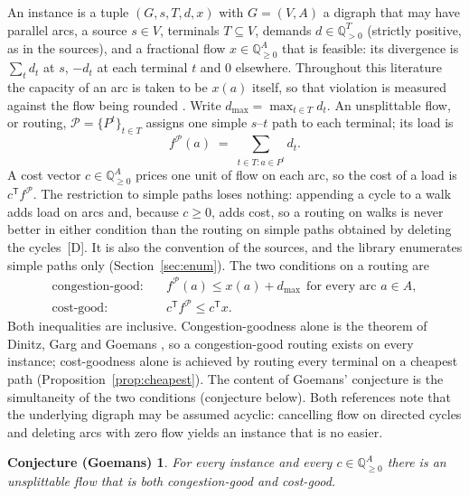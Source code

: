 \documentclass[11pt]{article}
\newtheorem*{namedconj}{Conjecture (Goemans)}
\theoremstyle{remark}
\newcommand{\dmax}{d_{\max}}
\newcommand{\flow}{f}
\newcommand{\Q}{\mathbb{Q}}
\begin{document}
An instance is a tuple $(G,s,T,d,x)$ with $G=(V,A)$ a digraph that may have parallel arcs, a source $s\in V$,
terminals $T\subseteq V$, demands $d\in\Q_{>0}^T$ (strictly positive, as in the sources), and a fractional flow $x\in\Q_{\ge0}^A$ that is feasible: its
divergence is $\sum_t d_t$ at $s$, $-d_t$ at each terminal $t$ and $0$ elsewhere. Throughout this literature the
capacity of an arc is taken to be $x(a)$ itself, so that violation is measured against the flow being rounded
\cite{TVZ24}. Write $\dmax=\max_{t\in T}d_t$. An unsplittable flow, or routing, $\mathcal P=\{P^t\}_{t\in T}$ assigns one
simple $s$--$t$ path to each terminal; its load is
\begin{equation}
\flow^{\mathcal P}(a)\;=\;\sum_{t\in T\colon a\in P^t}d_t .
\label{eq:load}
\end{equation}
A cost vector $c\in\Q_{\ge0}^A$ prices one unit of flow on each arc, so the cost of a load is $c^{\mathsf T}\flow^{\mathcal P}$.
The restriction to simple paths loses nothing: appending a cycle to a walk adds load on arcs and, because $c\ge0$,
adds cost, so a routing on walks is never better in either condition than the routing on simple paths obtained by deleting
the cycles \,[D]. It is also the convention of the sources, and the library enumerates simple paths only
(Section~\ref{sec:enum}). The two conditions on a routing are
\begin{align}
\text{congestion-good:}\quad & \flow^{\mathcal P}(a)\le x(a)+\dmax\ \ \text{for every arc }a\in A,
\label{eq:congestion}\\
\text{cost-good:}\quad & c^{\mathsf T}\flow^{\mathcal P}\le c^{\mathsf T}x .
\label{eq:cost}
\end{align}
Both inequalities are inclusive. Congestion-goodness alone is the theorem of Dinitz, Garg and Goemans \cite{DGG99}, so a
congestion-good routing exists on every instance; cost-goodness alone is achieved by routing every terminal on a cheapest
path (Proposition~\ref{prop:cheapest}). The content of Goemans' conjecture is the simultaneity of the two conditions
(conjecture below). Both references \cite{STVZ25,TVZ24} note that the underlying digraph may be assumed acyclic: cancelling
flow on directed cycles and deleting arcs with zero flow yields an instance that is no easier.

\begin{namedconj}
For every instance and every $c\in\Q^A_{\ge0}$ there is an unsplittable flow that is both congestion-good and cost-good.
\end{namedconj}
\end{document}
